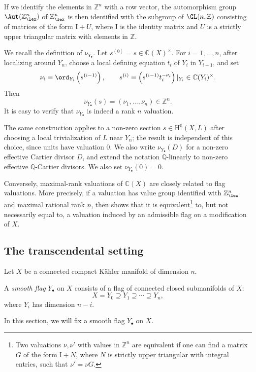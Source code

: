 If we identify the elements in $\mathbb{Z}^n$ with a row vector, the automorphism group $\Aut(\mathbb{Z}^n_{\lex})$ of $\mathbb{Z}^n_{\lex}$ is then identified with the subgroup of $\GL(n,\mathbb{Z})$ consisting of matrices of the form $\mathrm{I}+U$, where $\mathrm{I}$ is the identity matrix and $U$ is a strictly upper triangular matrix with elements in $\mathbb{Z}$.

We recall the definition of $\nu_{Y_\bullet}$. Let $s^{(0)}=s\in\mathbb C(X)^\times$. For $i=1,\ldots,n$, after localizing around $Y_n$, choose a local defining equation $t_i$ of $Y_i$ in $Y_{i-1}$, and set
\[
    \nu_i=\ord_{Y_i}\left(s^{(i-1)}\right),\qquad s^{(i)}=\left(s^{(i-1)}t_i^{-\nu_i}\right)|_{Y_i} \in \mathbb C(Y_i)^\times.
\]
Then
\[
    \nu_{Y_\bullet}(s)=(\nu_1,\ldots,\nu_n)\in\mathbb Z^n.
\]
It is easy to verify that $\nu_{Y_{\bullet}}$ is indeed a rank $n$ valuation.

The same construction applies to a non-zero section $s\in \mathrm H^0(X,L)$ after choosing a local trivialization of $L$ near $Y_n$; the result is independent of this choice, since units have valuation $0$. We also write $\nu_{Y_\bullet}(D)$ for a non-zero effective Cartier divisor $D$, and extend the notation $\mathbb Q$-linearly to non-zero effective $\mathbb Q$-Cartier divisors. We also set $\nu_{Y_{\bullet}}(0)=0$.

\begin{remark}\label{rmk:Abhyankar}
Conversely, maximal-rank valuations of $\mathbb C(X)$ are closely related to flag valuations. More precisely, if a valuation has value group identified with $\mathbb Z^n_{\lex}$ and maximal rational rank $n$, then \cite[Theorem~2.9]{CFKLRS17} shows that it is equivalent\footnote{Two valuations $\nu,\nu'$ with values in $\mathbb Z^n$ are equivalent if one can find a matrix $G$ of the form $\mathrm I+N$, where $N$ is strictly upper triangular with integral entries, such that $\nu'=\nu G$.} to, but not necessarily equal to, a valuation induced by an admissible flag on a modification of $X$.
\end{remark}

\subsection{The transcendental setting}
\label{subsec:flagval_trans}
Let $X$ be a connected compact Kähler manifold of dimension $n$.

\begin{definition}\label{def:Okounkov:L170}
    A \emph{smooth flag} $Y_{\bullet}$ on $X$ consists of a flag of connected closed submanifolds of $X$:
    \[
      X=Y_0\supseteq Y_1 \supseteq \cdots \supseteq Y_n,
    \]
    where $Y_i$ has dimension $n-i$.
\end{definition}
In this section, we will fix a smooth flag $Y_{\bullet}$ on $X$.



